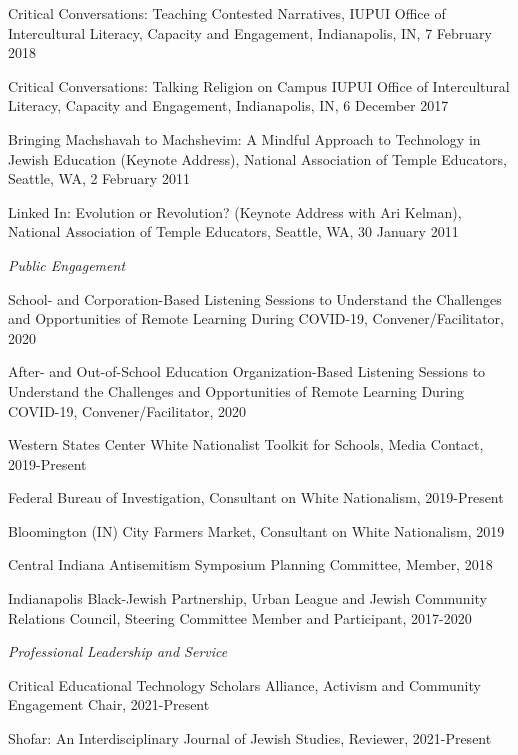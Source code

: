 \documentclass[11pt,article,oneside]{memoir}
\begin{document}
\ind Critical Conversations: Teaching Contested Narratives, IUPUI Office of Intercultural Literacy, Capacity and Engagement, Indianapolis, IN, 7 February 2018

\ind Critical Conversations: Talking Religion on Campus	IUPUI Office of Intercultural Literacy, Capacity and Engagement, Indianapolis, IN, 6 December 2017

\ind Bringing Machshavah to Machshevim: A Mindful Approach to Technology in Jewish Education (Keynote Address),	National Association of Temple Educators, Seattle, WA, 2 February 2011

\ind Linked In: Evolution or Revolution? (Keynote Address with Ari Kelman), National Association of Temple Educators, Seattle, WA, 30 January 2011

\medskip

\noindent\emph{Public Engagement \vspace{0.01in}}

\ind School- and Corporation-Based Listening Sessions to Understand the Challenges and Opportunities of Remote Learning During COVID-19, Convener/Facilitator, 2020

\ind After- and Out-of-School Education Organization-Based Listening Sessions to Understand the Challenges and Opportunities of Remote Learning During COVID-19, Convener/Facilitator, 2020

\ind Western States Center White Nationalist Toolkit for Schools, Media Contact, 2019-Present

\ind Federal Bureau of Investigation, Consultant on White Nationalism, 2019-Present

\ind Bloomington (IN) City Farmers Market, Consultant on White Nationalism, 2019

\ind Central Indiana Antisemitism Symposium Planning Committee, Member, 2018

\ind Indianapolis Black-Jewish Partnership, Urban League and Jewish Community Relations Council, Steering Committee Member and Participant, 2017-2020

\medskip

\noindent\emph{Professional Leadership and Service \vspace{0.01in}}

\ind Critical Educational Technology Scholars Alliance, Activism and Community Engagement Chair, 2021-Present

\ind Shofar: An Interdisciplinary Journal of Jewish Studies, Reviewer, 2021-Present
\end{document}
